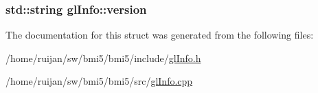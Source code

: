 \hypertarget{structglInfo_a3c189d62cff793f67c7df3d4d1992eda}{
\subsubsection[{version}]{\setlength{\rightskip}{0pt plus 5cm}std\-::string gl\-Info\-::version}}\label{structglInfo_a3c189d62cff793f67c7df3d4d1992eda}


The documentation for this struct was generated from the following files\-:\begin{DoxyCompactItemize}
\item 
/home/ruijan/sw/bmi5/bmi5/include/\hyperlink{glInfo_8h}{gl\-Info.\-h}\item 
/home/ruijan/sw/bmi5/bmi5/src/\hyperlink{glInfo_8cpp}{gl\-Info.\-cpp}\end{DoxyCompactItemize}
